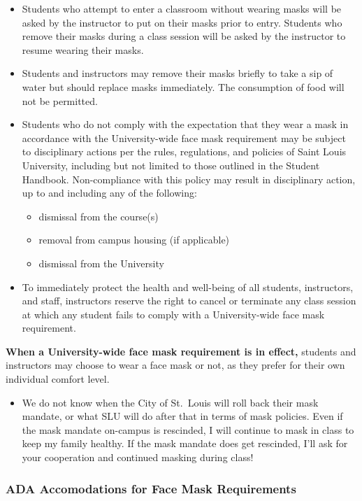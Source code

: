 \documentclass[
]{book}
\providecommand{\tightlist}{%
  \setlength{\itemsep}{0pt}\setlength{\parskip}{0pt}}
\newenvironment{rmdblock}[1]
  {\begin{shaded*}
  \begin{itemize}
  \renewcommand{\labelitemi}{
    \raisebox{-.7\height}[0pt][0pt]{
      {\setkeys{Gin}{width=3em,keepaspectratio}\texttt{[image: images/\#1]}}
    }
  }
  \item
  }
  {
  \end{itemize}
  \end{shaded*}
  }
\newenvironment{rmdwarning}
  {\begin{rmdblock}{warning}}
  {\end{rmdblock}}
\begin{document}
\begin{itemize}
\tightlist
\item
  Students who attempt to enter a classroom without wearing masks will be asked by the instructor to put on their masks prior to entry. Students who remove their masks during a class session will be asked by the instructor to resume wearing their masks.
\item
  Students and instructors may remove their masks briefly to take a sip of water but should replace masks immediately. The consumption of food will not be permitted.
\item
  Students who do not comply with the expectation that they wear a mask in accordance with the University-wide face mask requirement may be subject to disciplinary actions per the rules, regulations, and policies of Saint Louis University, including but not limited to those outlined in the Student Handbook. Non-compliance with this policy may result in disciplinary action, up to and including any of the following:

  \begin{itemize}
  \tightlist
  \item
    dismissal from the course(s)
  \item
    removal from campus housing (if applicable)
  \item
    dismissal from the University
  \end{itemize}
\item
  To immediately protect the health and well-being of all students, instructors, and staff, instructors reserve the right to cancel or terminate any class session at which any student fails to comply with a University-wide face mask requirement.
\end{itemize}

\textbf{When a University-wide face mask requirement is in effect,} students and instructors may choose to wear a face mask or not, as they prefer for their own individual comfort level.

\begin{rmdwarning}
We do not know when the City of St.~Louis will roll back their mask
mandate, or what SLU will do after that in terms of mask policies. Even
if the mask mandate on-campus is rescinded, I will continue to mask in
class to keep my family healthy. If the mask mandate does get rescinded,
I'll ask for your cooperation and continued masking during class!
\end{rmdwarning}

\hypertarget{ada-accomodations-for-face-mask-requirements}{%
\subsubsection{ADA Accomodations for Face Mask Requirements}\label{ada-accomodations-for-face-mask-requirements}}
\end{document}
